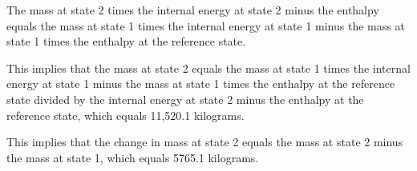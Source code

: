 The mass at state 2 times the internal energy at state 2 minus the enthalpy equals the mass at state 1 times the internal energy at state 1 minus the mass at state 1 times the enthalpy at the reference state.

This implies that the mass at state 2 equals the mass at state 1 times the internal energy at state 1 minus the mass at state 1 times the enthalpy at the reference state divided by the internal energy at state 2 minus the enthalpy at the reference state, which equals 11,520.1 kilograms.

This implies that the change in mass at state 2 equals the mass at state 2 minus the mass at state 1, which equals 5765.1 kilograms.